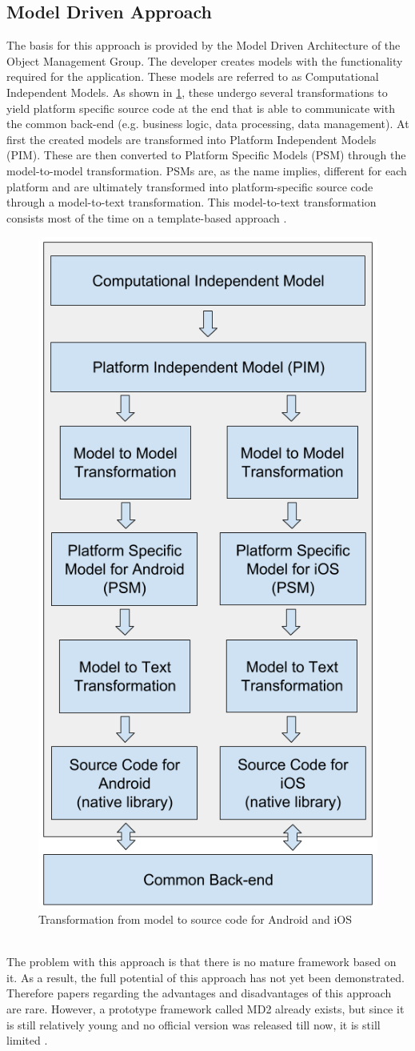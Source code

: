 \documentclass[Bachelor,BIF,english]{twbook}
\begin{document}
\subsection{Model Driven Approach}
The basis for this approach is provided by the Model Driven Architecture of the Object Management Group. The developer creates models with the functionality required for the application. These models are referred to as Computational Independent Models. As shown in \ref{Fig1}, these undergo several transformations to yield platform specific source code at the end that is able to communicate with the common back-end (e.g. business logic, data processing, data management). At first the created models are transformed into Platform Independent Models (PIM). These are then converted to Platform Specific Models (PSM) through the model-to-model transformation. PSMs are, as the name implies, different for each platform and are ultimately transformed into platform-specific source code through a model-to-text transformation. This model-to-text transformation consists most of the time on a template-based approach \cite[p.~4]{7479278} \cite[p.~3]{7934674}.
\begin{figure}[!htbp]
\centering
\includegraphics[width=0.5\linewidth]{PICs/MDA.png}
\caption{Transformation from model to source code for Android and iOS \cite[p.~4]{7479278} \cite[p.~3]{7934674}}\label{Fig1}
\end{figure}
\\[\baselineskip]
The problem with this approach is that there is no mature framework based on it. As a result, the full potential of this approach has not yet been demonstrated. Therefore papers regarding the advantages and disadvantages of this approach are rare. However, a prototype framework called MD2 \cite{MD2} already exists, but since it is still relatively young and no official version was released till now, it is still limited \cite[p.~3-4]{7934674}.
\end{document}

